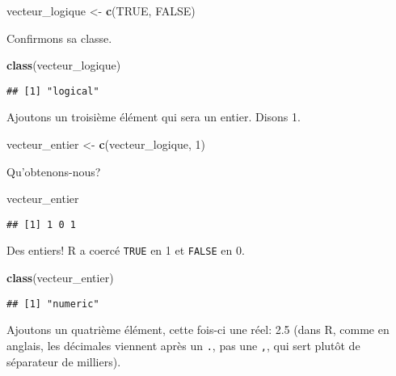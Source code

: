 \documentclass[]{book}
\newenvironment{Shaded}{\begin{snugshade}}{\end{snugshade}}
\newcommand{\KeywordTok}[1]{\textcolor[rgb]{0.13,0.29,0.53}{\textbf{#1}}}
\newcommand{\DecValTok}[1]{\textcolor[rgb]{0.00,0.00,0.81}{#1}}
\newcommand{\StringTok}[1]{\textcolor[rgb]{0.31,0.60,0.02}{#1}}
\newcommand{\OtherTok}[1]{\textcolor[rgb]{0.56,0.35,0.01}{#1}}
\newcommand{\NormalTok}[1]{#1}
\begin{document}
\begin{Shaded}
\begin{Highlighting}[]
\NormalTok{vecteur_logique <-}\StringTok{ }\KeywordTok{c}\NormalTok{(}\OtherTok{TRUE}\NormalTok{, }\OtherTok{FALSE}\NormalTok{)}
\end{Highlighting}
\end{Shaded}

Confirmons sa classe.

\begin{Shaded}
\begin{Highlighting}[]
\KeywordTok{class}\NormalTok{(vecteur_logique)}
\end{Highlighting}
\end{Shaded}

\begin{verbatim}
## [1] "logical"
\end{verbatim}

Ajoutons un troisième élément qui sera un entier. Disons 1.

\begin{Shaded}
\begin{Highlighting}[]
\NormalTok{vecteur_entier <-}\StringTok{ }\KeywordTok{c}\NormalTok{(vecteur_logique, }\DecValTok{1}\NormalTok{)}
\end{Highlighting}
\end{Shaded}

Qu'obtenons-nous?

\begin{Shaded}
\begin{Highlighting}[]
\NormalTok{vecteur_entier}
\end{Highlighting}
\end{Shaded}

\begin{verbatim}
## [1] 1 0 1
\end{verbatim}

Des entiers! R a coercé \texttt{TRUE} en 1 et \texttt{FALSE} en 0.

\begin{Shaded}
\begin{Highlighting}[]
\KeywordTok{class}\NormalTok{(vecteur_entier)}
\end{Highlighting}
\end{Shaded}

\begin{verbatim}
## [1] "numeric"
\end{verbatim}

Ajoutons un quatrième élément, cette fois-ci une réel: 2.5 (dans R,
comme en anglais, les décimales viennent après un \texttt{.}, pas une
\texttt{,}, qui sert plutôt de séparateur de milliers).
\end{document}

